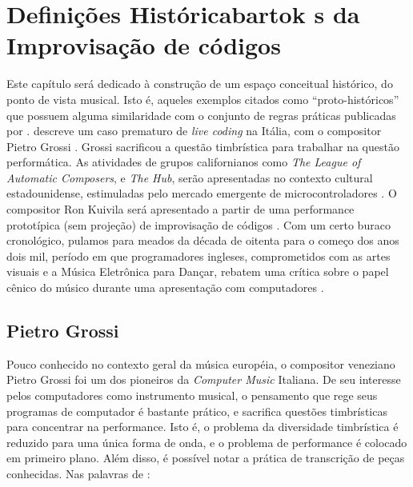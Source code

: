 \chapter{Definições Históricabartok
s da Improvisação de códigos}\label{sec:protohistoria}

Este capítulo será dedicado à construção de um espaço conceitual histórico, do ponto de vista musical. Isto é, aqueles exemplos citados como ``proto-históricos'' que possuem alguma similaridade com o conjunto de regras práticas publicadas por  .  descreve um caso prematuro de \emph{live coding} na Itália, com o compositor Pietro Grossi . Grossi sacrificou a questão timbrística para trabalhar na questão performática. As atividades de grupos californianos como \emph{The League of Automatic Composers}, e \emph{The Hub}, serão apresentadas no contexto cultural estadounidense, estimuladas pelo mercado emergente de microcontroladores . O compositor Ron Kuivila será apresentado a partir de uma performance prototípica (sem projeção) de improvisação de códigos . Com um certo buraco cronológico, pulamos para meados da década de oitenta para o começo dos anos dois mil, período em que programadores ingleses,  comprometidos com as artes visuais e a Música Eletrônica para Dançar, rebatem uma crítica sobre o papel cênico do músico durante uma apresentação com computadores . 


\section{Pietro Grossi}\label{sec:grossi}

Pouco conhecido no contexto geral da música européia, o compositor veneziano Pietro Grossi foi  um dos pioneiros da \emph{Computer Music} Italiana. De seu interesse pelos computadores como instrumento musical, o pensamento que rege seus programas de computador é bastante prático, e sacrifica questões timbrísticas para concentrar na performance. Isto é, o problema da diversidade timbrística é reduzido para uma única forma de onda, e o problema de performance é colocado em primeiro plano. Além disso, é possível notar a prática de transcrição de peças conhecidas. Nas palavras de :

